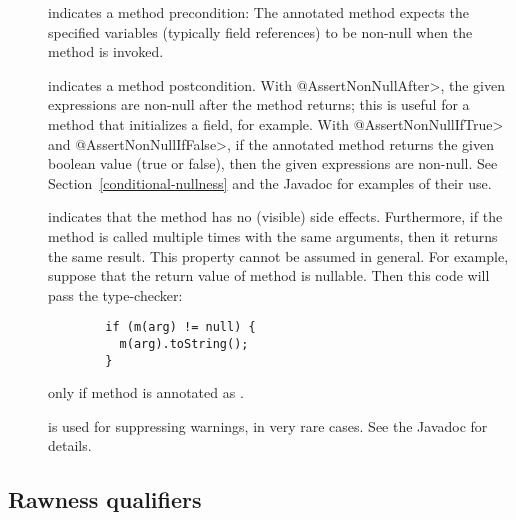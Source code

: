 \begin{description}

\item[]
  indicates a method precondition:  The annotated method expects the
  specified variables (typically field references) to be non-null when the
  method is invoked.

\item[]
\item[]
\item[]
  indicates a method postcondition.  With \<@AssertNonNullAfter>, the given
  expressions are non-null after the method returns; this is useful for a
  method that initializes a field, for example.  With
  \<@AssertNonNullIfTrue> and \<@AssertNonNullIfFalse>, if the annotated
  method returns the given boolean value (true or false), then the given
  expressions are non-null.  See Section~\ref{conditional-nullness} and the
  Javadoc for examples of their use.

\item[]
  indicates that the method has no (visible) side effects.  Furthermore,
  if the method is called multiple times with the same
  arguments, then it returns the same result.  This property cannot be
  assumed in general.  For example, suppose that the return value of method
   is nullable.  Then this code will pass the type-checker:

\begin{Verbatim}
        if (m(arg) != null) {
          m(arg).toString();
        }
\end{Verbatim}

\noindent
only if method  is annotated as .

\item[]
  is used for suppressing warnings, in very rare cases.  See the Javadoc for
  details.

\end{description}


\subsection{Rawness qualifiers\label{rawness-qualifiers}}

